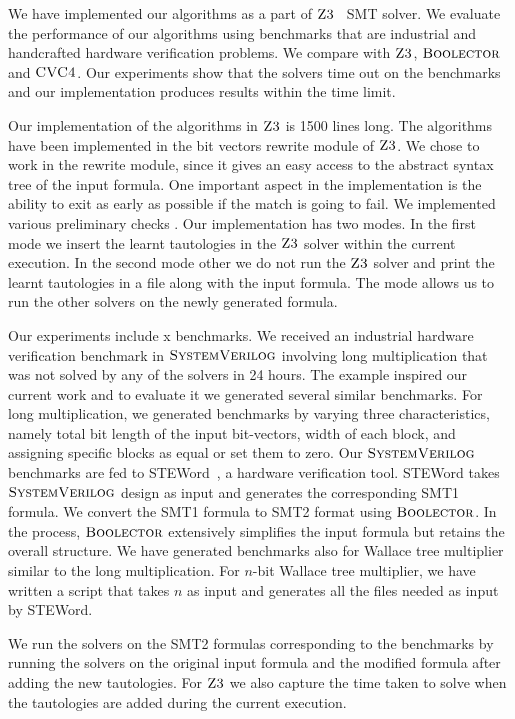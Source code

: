 

We have implemented our algorithms as a part of $\textsc{Z3}$~\cite{z3} SMT solver.
%
 We evaluate the performance of our algorithms using benchmarks that are industrial and handcrafted hardware verification problems.
%
We compare with $\textsc{Z3}$, $\textsc{Boolector}$\cite{boolector} and $\textsc{CVC4}$\cite{cvc4}.
%
Our experiments show that the solvers time out on the benchmarks and our implementation produces results within the time limit.

Our implementation of the algorithms in $\textsc{Z3}$ is 1500 lines long.
%
The algorithms have been implemented in the bit vectors rewrite module of $\textsc{Z3}$.
%
We chose to work in the rewrite module, since it gives an easy access to the abstract syntax tree of the input formula.
%
One important aspect in the implementation is the ability to exit as early as possible if the match is going to fail.
%
We implemented various preliminary checks .
%
Our implementation has two modes.
%
In the first mode we insert the learnt tautologies in the $\textsc{Z3}$ solver within the current execution.
%
In the second mode other we do not run  the $\textsc{Z3}$ solver and print the learnt tautologies in a file along with the input formula.
%
The mode allows us to run the other solvers on the newly generated formula.

Our experiments include x benchmarks.
%
We received an industrial hardware verification benchmark in $\textsc{SystemVerilog}$ involving long multiplication that was not solved by any of the solvers in 24 hours.
%
The example inspired our current work and to evaluate it we generated several similar benchmarks.
%
For long multiplication, we generated benchmarks by varying three characteristics, namely total bit length of the input bit-vectors, width of each block, and assigning specific blocks as equal or set them to zero.
%
Our $\textsc{SystemVerilog}$ benchmarks are fed to STEWord~\cite{Word-level-Symbolic-Trajectory-Evaluation}, a hardware verification tool.
%
STEWord takes $\textsc{SystemVerilog}$ design as input and generates the corresponding SMT1 formula.
%
We convert the SMT1 formula to SMT2 format using $\textsc{Boolector}$.
%
In the process, $\textsc{Boolector}$ extensively simplifies the input formula but retains the overall structure.
%
We have generated benchmarks also for Wallace tree multiplier similar to the long multiplication.
%
For $n$-bit Wallace tree multiplier, we have written a script that takes $n$ as input and generates all the files needed as input by STEWord.
%


We run the solvers on the SMT2 formulas corresponding to the benchmarks by running the solvers on the original input formula and the modified formula after adding the new tautologies.
%
For $\textsc{Z3}$ we also capture the time taken to solve when the tautologies are added during the current execution.

